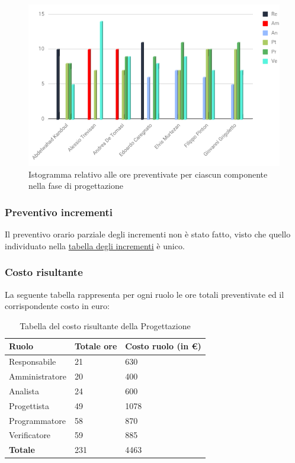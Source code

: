 \begin{figure}[h!]
	\caption{Istogramma relativo alle ore preventivate per ciascun componente nella fase di progettazione}
    \includegraphics[width=1\textwidth]{./src/Preventivo/src/img/IstoProj.png}  
\end{figure}
\subsubsection{Preventivo incrementi}
Il preventivo orario parziale degli incrementi non è stato fatto, visto che quello individuato nella \hyperlink{TabellaIncrementi}{tabella degli incrementi} è unico.

\clearpage
\subsubsection{Costo risultante}
La seguente tabella rappresenta per ogni ruolo le ore totali preventivate ed il corrispondente costo in euro:
{
\renewcommand{\arraystretch}{2}
\begin{longtable}{ C{3cm} C{2cm} C{4cm}}
\caption{Tabella del costo risultante della Progettazione}\\
\rowcolor{\primaryColor}

\textcolor{\secondaryColor}{\textbf{Ruolo}} & 
\textcolor{\secondaryColor}{\textbf{Totale ore}} & 
\textcolor{\secondaryColor}{\textbf{Costo ruolo (in \euro{})}}\\	
\endhead
        
Responsabile    &  21 &  630 \\
Amministratore  &  20 &  400 \\
Analista        &  24 &  600 \\
Progettista     &  49 &  1078 \\
Programmatore   &  58 &  870 \\
Verificatore    &  59 &  885 \\
\textbf{Totale} &  231 & 4463 \\	
        	
\end{longtable}
}

